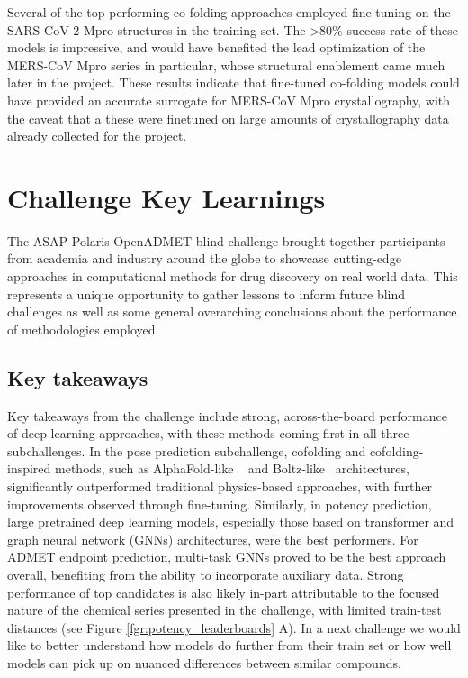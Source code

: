 \documentclass[journal=jcim,manuscript=article]{achemso}
\begin{document}
{Several of the top performing co-folding approaches employed fine-tuning on the SARS-CoV-2 Mpro structures in the training set. The \textgreater 80\% success rate of these models is impressive, and would have benefited the lead optimization of the MERS-CoV Mpro series in particular, whose structural enablement came much later in the project. These results indicate that fine-tuned co-folding models could have provided an accurate surrogate for MERS-CoV Mpro crystallography, with the caveat that a these were finetuned on large amounts of crystallography data already collected for the project.

\section{Challenge Key Learnings}

The ASAP-Polaris-OpenADMET blind challenge brought together participants from academia and industry around the globe to showcase cutting-edge approaches in computational methods for drug discovery on real world data. This represents a unique opportunity to gather lessons to inform future blind challenges as well as some general overarching conclusions about the performance of methodologies employed.


\subsection{Key takeaways}

Key takeaways from the challenge include strong, across-the-board performance of deep learning approaches, with these methods coming first in all three subchallenges. In the pose prediction subchallenge, cofolding and cofolding-inspired methods, such as AlphaFold-like ~\cite{abramson_2024_alphafold} and Boltz-like~\cite{wohlwend_2024_boltz-1, passaro_2025_boltz-2} architectures, significantly outperformed traditional physics-based approaches, with further improvements observed through fine-tuning. Similarly, in potency prediction, large pretrained deep learning models, especially those based on transformer and graph neural network (GNNs) architectures, were the best performers. For ADMET endpoint prediction, multi-task GNNs proved to be the best approach overall, benefiting from the ability to incorporate auxiliary data. Strong performance of top candidates is also likely in-part attributable to the focused nature of the chemical series presented in the challenge, with limited train-test distances (see Figure \ref{fgr:potency_leaderboards} A). In a next challenge we would like to better understand how models do further from their train set or how well models can pick up on nuanced differences between similar compounds.

}
\end{document}
